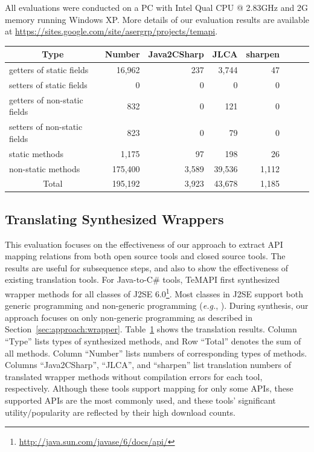 All evaluations were conducted on a PC with Intel Qual CPU @ 2.83GHz and 2G memory running Windows XP. More details
of our evaluation results are available at \url{https://sites.google.com/site/asergrp/projects/temapi}.
\begin{table}[t]
\centering
\begin{SmallOut}
\begin {tabular} {|l|r|r|r|r|r|r|r|}
 \hline
\multicolumn{1}{|c}{\textbf{Type}}& \multicolumn{1}{|c|}{\textbf{Number}}
& \multicolumn{1}{|c|}{\textbf{Java2CSharp}} & \multicolumn{1}{|c|}{\textbf{JLCA}}& \multicolumn{1}{|c|}{\textbf{sharpen}} \\
\hline
getters of static fields      & 16,962 &   237 &  3,744 &  47 \\
\hline
setters of static fields      & 0      & 0     & 0      & 0  \\
\hline
getters of non-static fields  & 832    & 0    &   121  &  0  \\
\hline
setters of non-static fields  & 823    & 0    &   79   &  0   \\
\hline
static methods                & 1,175   & 97   &  198  &  26  \\
\hline
non-static methods            & 175,400 &3,589 &  39,536& 1,112  \\
\hline
\multicolumn{1}{|c|}{Total}   & 195,192 & 3,923 & 43,678 & 1,185\\
\hline
\end{tabular}%
 \label{table:java2csharp}
\end{SmallOut}\vspace*{-6ex}
\end{table}

\subsection{Translating Synthesized Wrappers}
\label{sec:evaluation:element}
This evaluation focuses on the effectiveness of our approach to extract API mapping relations from both open source tools and closed source tools. The results are useful for subsequence steps, and also to show the effectiveness of existing translation tools. For Java-to-C\# tools, TeMAPI first synthesized wrapper methods for all classes of J2SE 6.0\footnote{\url{http://java.sun.com/javase/6/docs/api/}}. Most classes in J2SE support both generic programming and non-generic programming (\emph{e.g.}, ). During synthesis, our approach focuses on only non-generic programming as described in Section~\ref{sec:approach:wrapper}. Table~\ref{table:java2csharp} shows the translation results. Column ``Type'' lists types of synthesized methods, and Row ``Total'' denotes the sum of all methods. Column ``Number'' lists numbers of corresponding types of methods. Columns ``Java2CSharp'', ``JLCA'', and ``sharpen'' list translation numbers of translated wrapper methods without compilation errors for each tool, respectively. Although these tools support mapping for only some APIs, these supported APIs are the most commonly used, and these tools' significant utility/popularity are reflected by their high download counts.

